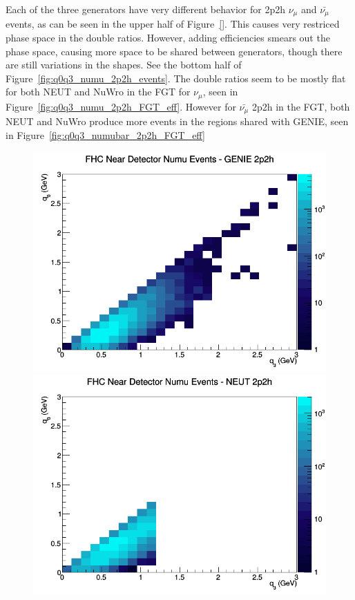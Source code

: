 \documentclass[12pt]{article}
\begin{document}
\FloatBarrier
Each of the three generators have very different behavior for 2p2h $\nu_\mu$ and $\bar{\nu_{\mu}}$ events, as can be seen in the upper half of Figure~\ref{}. This causes very restriced phase space in the double ratios. However, adding efficiencies smears out the phase space, causing more space to be shared between generators, though there are still variations in the shapes. See the bottom half of Figure~\ref{fig:q0q3_numu_2p2h_events}. The double ratios seem to be mostly flat for both NEUT and NuWro in the FGT for $\nu_{\mu}$, seen in Figure~\ref{fig:q0q3_numu_2p2h_FGT_eff}. However for $\bar{\nu_{\mu}}$ 2p2h in the FGT, both NEUT and NuWro produce more events in the regions shared with GENIE, seen in Figure~\ref{fig:q0q3_numubar_2p2h_FGT_eff}
\begin{figure}[h]
\centering
{}
\includegraphics[width=\linewidth]{q0_q3/nominal/2p2h_FHC_ND_numu_q3_q0_GENIE.png}
\endminipage
{}
\includegraphics[width=\linewidth]{q0_q3/nominal/2p2h_FHC_ND_numu_q3_q0_NEUT.png}

\end{figure}
\end{document}

